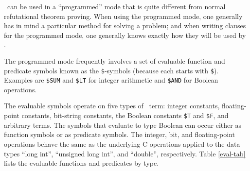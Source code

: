 \documentclass[11pt]{article}
\begin{document}
\otter\ can be used in a ``programmed'' mode that is quite different
from normal refutational theorem proving.  When using the programmed
mode, one generally has in mind a particular method for solving a
problem; and when writing clauses for the programmed mode, one
generally knows exactly how they will be used by \otter.

The programmed mode frequently involves a set of evaluable function
and predicate symbols known as the \verb:$:-symbols (because each
starts with \verb:$:).  Examples are \verb:$SUM: and \verb:$LT:
for integer arithmetic and \verb:$AND: for Boolean operations.

The evaluable symbols operate on five types of \otter\ term: integer
constants, floating-point constants, bit-string constants,
the Boolean constants \verb:$T: and
\verb:$F:, and arbitrary terms.  The symbols that evaluate to type
Boolean can occur either as function symbols or as predicate symbols.
The integer, bit, and floating-point operations behave the same as
the underlying C operations applied to the data types ``long int'',
``unsigned long int'', and ``double'', respectively.  Table \ref{eval-tab}
lists the evaluable functions and predicates by type.
\end{document}

